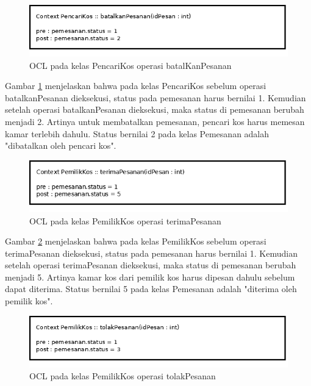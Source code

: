 	\begin{figure}[H]
		\centering
		\includegraphics[scale=0.5]{gambar/ocl/batalKanPesanan}
		\caption{OCL pada kelas PencariKos operasi batalKanPesanan}
		\label{ocl13}
	\end{figure}
	
	Gambar \ref{ocl13} menjelaskan bahwa pada kelas PencariKos sebelum operasi batalkanPesanan dieksekusi, status pada pemesanan harus bernilai 1. Kemudian setelah operasi batalkanPesanan dieksekusi, maka status di pemesanan berubah menjadi 2. Artinya untuk membatalkan pemesanan, pencari kos harus memesan kamar terlebih dahulu. Status bernilai 2 pada kelas Pemesanan adalah "dibatalkan oleh pencari kos". 
	
	\begin{figure}[H]
		\centering
		\includegraphics[scale=0.5]{gambar/ocl/terimaPesanan}
		\caption{OCL pada kelas PemilikKos operasi terimaPesanan}
		\label{ocl14}
	\end{figure}
	
	Gambar \ref{ocl14} menjelaskan bahwa pada kelas PemilikKos sebelum operasi terimaPesanan dieksekusi, status pada pemesanan harus bernilai 1. Kemudian setelah operasi terimaPesanan dieksekusi, maka status di pemesanan berubah menjadi 5. Artinya kamar kos dari pemilik kos harus dipesan dahulu sebelum dapat diterima. Status bernilai 5 pada kelas Pemesanan adalah "diterima oleh pemilik kos".
	
	\begin{figure}[H]
		\centering
		\includegraphics[scale=0.5]{gambar/ocl/tolakPesanan}
		\caption{OCL pada kelas PemilikKos operasi tolakPesanan}
		\label{ocl15}
	\end{figure}
	
